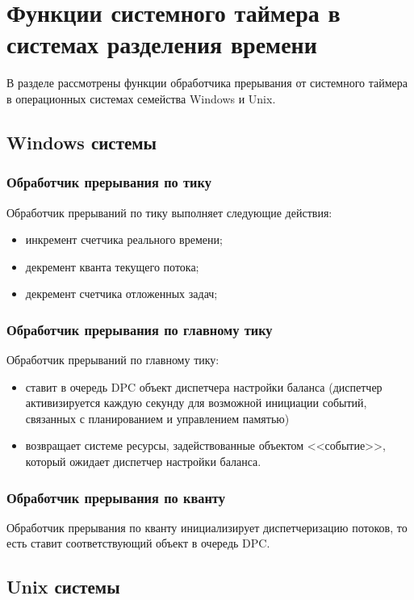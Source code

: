 \chapter{Функции системного таймера \newline в системах разделения времени}
В разделе рассмотрены функции обработчика прерывания от системного таймера в операционных системах семейства Windows и Unix. 

\section{Windows системы}

\subsection{Обработчик прерывания по тику}
Обработчик прерываний по тику выполняет следующие действия:
\begin{itemize}
	\item инкремент счетчика реального времени;
	\item декремент кванта текущего потока;
	\item декремент счетчика отложенных задач;
	
\end{itemize}
\subsection{Обработчик прерывания по главному тику}

Обработчик прерываний по главному тику:
\begin{itemize}
	\item ставит в очередь DPC объект диспетчера настройки баланса (диспетчер активизируется каждую секунду для возможной инициации событий, связанных с планированием и управлением памятью)
	\item возвращает системе ресурсы, задействованные объектом <<событие>>, который ожидает диспетчер настройки баланса.
\end{itemize}
 

\subsection{Обработчик прерывания по кванту}
Обработчик прерывания по кванту инициализирует диспетчеризацию потоков, то есть ставит соответствующий объект в очередь DPC.
\section{Unix системы}
